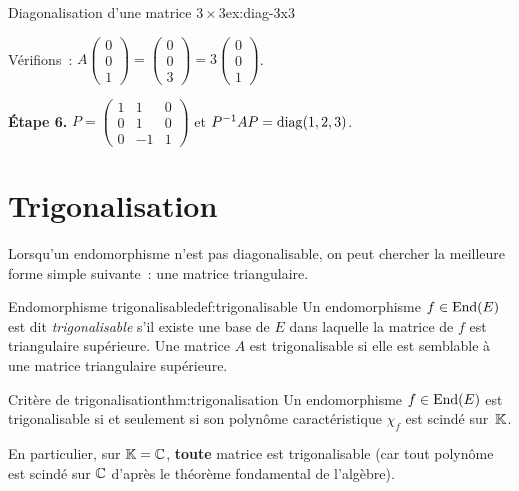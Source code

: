 \begin{example}{Diagonalisation d'une matrice $3\times 3$}{ex:diag-3x3}
\begin{itemize}
      Vérifions~: $A\begin{pmatrix}0\\0\\1\end{pmatrix}
      =\begin{pmatrix}0\\0\\3\end{pmatrix}
      =3\begin{pmatrix}0\\0\\1\end{pmatrix}$. \checkmark
  \end{itemize}

  \textbf{Étape 6.}
  $P=\begin{pmatrix}1&1&0\\0&1&0\\0&-1&1\end{pmatrix}$ et
  ${P}^{-1}AP=\operatorname{diag}(1,2,3)$.
\end{example}

\section{Trigonalisation}\label{sec:trigonalisation}

Lorsqu'un endomorphisme n'est pas diagonalisable, on peut chercher la
meilleure forme simple suivante~: une matrice triangulaire.

\begin{definition}{Endomorphisme trigonalisable}{def:trigonalisable}
  Un endomorphisme $f\in\operatorname{End}(E)$ est dit \emph{trigonalisable} s'il
  existe une base de $E$ dans laquelle la matrice de $f$ est
  triangulaire supérieure. Une matrice $A$ est trigonalisable si elle
  est semblable à une matrice triangulaire supérieure.
\end{definition}

\begin{theorem}{Critère de trigonalisation}{thm:trigonalisation}
  Un endomorphisme $f\in\operatorname{End}(E)$ est trigonalisable si et seulement si
  son polynôme caractéristique $\chi_f$ est scindé sur~${\mathbb{K}}$.

  En particulier, sur ${\mathbb{K}}={\mathbb{C}}$, \textbf{toute} matrice est
  trigonalisable (car tout polynôme est scindé sur ${\mathbb{C}}$ d'après le
  théorème fondamental de l'algèbre).
\end{theorem}

